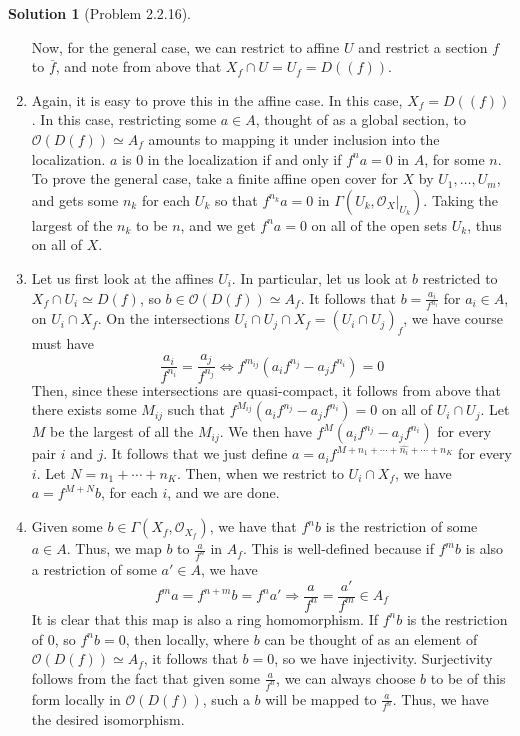 \documentclass[aps,pra,showpacs,notitlepage,onecolumn,superscriptaddress,nofootinbib]{revtex4-1}
\theoremstyle{definition}
\newtheorem{solution}{Solution}[section]
\begin{document}
\begin{solution}[Problem 2.2.16]
\begin{enumerate}
      Now, for the general case, we can restrict to affine $U$ and restrict a section $f$ to $\overline{f}$, and note from above that $X_f \cap U = U_f = D((f))$.
      \item Again, it is easy to prove this in the affine case. In this case, $X_f = D((f))$. In this case, restricting some $a \in A$, thought of as a global section, to $\mathcal{O}(D(f)) \simeq A_f$ amounts to
        mapping it under inclusion into the localization. $a$ is $0$ in the localization if and only if $f^n a = 0$ in $A$, for some $n$. To prove the general case, take a finite affine open cover for $X$
        by $U_1, \dots, U_m$, and gets some $n_k$ for each $U_k$ so that $f^{n_k} a = 0$ in $\Gamma(U_k, \mathcal{O}_X|_{U_k})$. Taking the largest of the $n_k$ to be $n$, and we get $f^n a = 0$ on all of the open
        sets $U_k$, thus on all of $X$.
        \item Let us first look at the affines $U_i$. In particular, let us look at $b$ restricted to $X_f \cap U_i \simeq D(f)$, so $b \in \mathcal{O}(D(f)) \simeq A_f$. It follows that $b = \frac{a_i}{f^{n_i}}$
          for $a_i \in A$, on $U_i \cap X_f$. On the intersections $U_i \cap U_j \cap X_f = (U_i \cap U_j)_f$, we have course must have
          \begin{equation}
            \frac{a_i}{f^{n_i}} = \frac{a_j}{f^{n_j}} \Longleftrightarrow f^{m_{ij}} (a_i f^{n_j} - a_j f^{n_i}) = 0
            \end{equation}
          Then, since these intersections are quasi-compact, it follows from above that there exists some $M_{ij}$ such that $f^{M_{ij}} (a_i f^{n_j} - a_j f^{n_i}) = 0$
          on all of $U_i \cap U_j$. Let $M$ be the largest of all the $M_{ij}$. We then have $f^{M} (a_i f^{n_j} - a_j f^{n_i})$ for every pair $i$ and $j$. It follows that we just define
          $a = a_i f^{M + n_1 + \cdots + \hat{n_i} + \cdots + n_K}$ for every $i$. Let $N = n_1 + \cdots + n_K$. Then, when we restrict to $U_i \cap X_f$, we have $a = f^{M + N} b$, for each $i$,
          and we are done.
          \item Given some $b \in \Gamma(X_f, \mathcal{O}_{X_f})$, we have that $f^n b$ is the restriction of some $a \in A$. Thus, we map $b$ to $\frac{a}{f^n}$ in $A_f$.
            This is well-defined because if $f^m b$ is also a restriction of some $a' \in A$, we have
            \begin{equation}
              f^m a = f^{n + m} b = f^n a' \Longrightarrow \frac{a}{f^n} = \frac{a'}{f^m} \in A_f
              \end{equation}
            It is clear that this map is also a ring homomorphism. If $f^n b$ is the restriction of $0$, so $f^n b = 0$, then locally, where $b$ can be thought of as an element of $\mathcal{O}(D(f)) \simeq A_f$,
            it follows that $b = 0$, so we have injectivity. Surjectivity follows from the fact that given some $\frac{a}{f^n}$, we can always choose $b$ to be of this form locally in $\mathcal{O}(D(f))$, such a $b$ will be mapped
            to $\frac{a}{f^n}$. Thus, we have the desired isomorphism.
    \end{enumerate}
  \end{solution}
\end{document}
